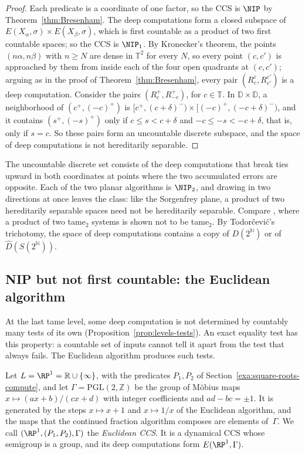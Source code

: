 \begin{proof}
Each predicate is a coordinate of one factor, so the CCS is $\NIP$ by
Theorem~\ref{thm:Bresenham}.
The deep computations form a closed subspace of
$E(X_\alpha,\sigma)\times E(X_\beta,\sigma)$, which is first countable as a
product of two first countable spaces; so the CCS is $\NIP_1$.
By Kronecker's theorem, the points $(n\alpha,n\beta)$ with $n\ge N$ are dense in
$\mathbb{T}^2$ for every $N$, so every point $(c,c')$ is approached by them from
inside each of the four open quadrants at $(c,c')$; arguing as in the proof of
Theorem~\ref{thm:Bresenham}, every pair $(R_c^\varepsilon,R_{c'}^{\varepsilon'})$
is a deep computation.
Consider the pairs $(R_c^+,R_{-c}^+)$, for $c\in\mathbb{T}$.
In $\mathbb{D}\times\mathbb{D}$, a neighborhood of $(c^+,(-c)^+)$ is
$[c^+,(c+\delta)^-)\times[(-c)^+,(-c+\delta)^-)$, and it contains
$(s^+,(-s)^+)$ only if $c\le s<c+\delta$ and $-c\le -s<-c+\delta$, that is,
only if $s=c$.
So these pairs form an uncountable discrete subspace, and the space of deep
computations is not hereditarily separable.
\end{proof}

The uncountable discrete set consists of the deep computations that break
ties upward in both coordinates at points where the two accumulated errors are
opposite.
Each of the two planar algorithms is $\NIP_2$, and drawing in two directions at
once leaves the class: like the Sorgenfrey plane, a product of two
hereditarily separable spaces need not be hereditarily separable.
Compare \cite[Proposition~4.1]{glasner2022tame}, where a product of two
tame$_2$ systems is shown not to be tame$_2$.
By Todorčević's trichotomy, the space of deep computations contains a copy of
$D(2^{\mathbb{N}})$ or of $\hat D(S(2^{\mathbb{N}}))$.


\subsection{NIP but not first countable: the Euclidean algorithm}
\label{sec:ex-NIP}
At the last tame level, some deep computation is not determined by countably
many tests of its own (Proposition~\ref{prop:levels-tests}).
An exact equality test has this property: a countable set of inputs cannot
tell it apart from the test that always fails.
The Euclidean algorithm produces such tests.

Let $L=\RP^1=\mathbb{R}\cup\{\infty\}$, with the predicates $P_1,P_2$ of
Section~\ref{exa:square-roots-compute}, and let $\Gamma=\mathrm{PGL}(2,\mathbb{Z})$ be the
group of Möbius maps $x\mapsto(ax+b)/(cx+d)$ with integer coefficients and
$ad-bc=\pm1$.
It is generated by the steps $x\mapsto x+1$ and $x\mapsto1/x$ of the
Euclidean algorithm, and the maps that the continued fraction algorithm
composes are elements of~$\Gamma$.
We call $(\RP^1,(P_1,P_2),\Gamma)$ the \emph{Euclidean CCS}.
It is a dynamical CCS whose semigroup is a group, and its deep computations
form $E(\RP^1,\Gamma)$.

